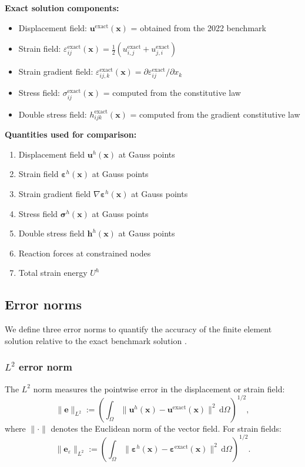 \documentclass[11pt]{article}
\newcommand{\bx}{\mathbf{x}}
\newcommand{\bx}{\mathbf{x}}
\begin{document}
\textbf{Exact solution components:}
\begin{itemize}
\item Displacement field: $\mathbf{u}^{\mathrm{exact}}(\bx)$ = obtained from the 2022 benchmark
\item Strain field: $\varepsilon_{ij}^{\mathrm{exact}}(\bx) = \tfrac12(u_{i,j}^{\mathrm{exact}}+u_{j,i}^{\mathrm{exact}})$
\item Strain gradient field: $\varepsilon_{ij,k}^{\mathrm{exact}}(\bx) = \partial\varepsilon_{ij}^{\mathrm{exact}}/\partial x_{k}$
\item Stress field: $\sigma_{ij}^{\mathrm{exact}}(\bx)$ = computed from the constitutive law
\item Double stress field: $h_{ijk}^{\mathrm{exact}}(\bx)$ = computed from the gradient constitutive law
\end{itemize}

\textbf{Quantities used for comparison:}
\begin{enumerate}
\item Displacement field $\mathbf{u}^{h}(\bx)$ at Gauss points
\item Strain field $\boldsymbol{\varepsilon}^{h}(\bx)$ at Gauss points
\item Strain gradient field $\nabla\boldsymbol{\varepsilon}^{h}(\bx)$ at Gauss points
\item Stress field $\boldsymbol{\sigma}^{h}(\bx)$ at Gauss points
\item Double stress field $\mathbf{h}^{h}(\bx)$ at Gauss points
\item Reaction forces at constrained nodes
\item Total strain energy $U^{h}$
\end{enumerate}

\subsection{Error norms}
\label{ssec:error_norms}

We define three error norms to quantify the accuracy of the finite
element solution relative to the exact benchmark solution
\cite{Hughes1987,ZienkiewiczTaylor2000}.

\subsubsection{$L^{2}$ error norm}

The $L^{2}$ norm measures the pointwise error in the displacement or
strain field:
\begin{equation}
\|\mathbf{e}\|_{L^{2}}
:= \left(\int_{\Omega}
   \|\mathbf{u}^{h}(\bx)-\mathbf{u}^{\mathrm{exact}}(\bx)\|^{2}\,
   \mathrm{d}\Omega\right)^{1/2},
\label{s8:L2_norm}
\end{equation}
where $\|\cdot\|$ denotes the Euclidean norm of the vector field. For
strain fields:
\begin{equation}
\|\mathbf{e}_{\varepsilon}\|_{L^{2}}
:= \left(\int_{\Omega}
   \|\boldsymbol{\varepsilon}^{h}(\bx)-\boldsymbol{\varepsilon}^{\mathrm{exact}}(\bx)\|^{2}\,
   \mathrm{d}\Omega\right)^{1/2}.
\label{s8:L2_strain}
\end{equation}
\end{document}
